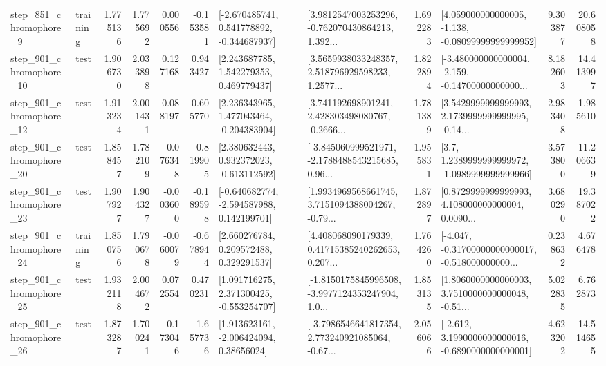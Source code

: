 \begin{tabular}{llrrrrllrlrr}
   step\_851\_chromophore\_9 &  training &      1.775136 &    1.775692 &      0.000556 & -0.153581 &   [-2.670485741, 0.541778892, -0.344687937] &  [3.9812547003253296, -0.762070430864213, 1.392... &       1.692283 &  [4.059000000000005, -1.138, -0.08099999999999952] &            9.303877 &         20.608058 \\
  step\_901\_chromophore\_10 &      test &      1.906730 &    2.033898 &      0.127168 &  0.943427 &     [2.243687785, 1.542279353, 0.469779437] &  [3.5659938033248357, 2.518796929598233, 1.2577... &       1.822894 &  [-3.480000000000004, -2.159, -0.14700000000000... &            8.182603 &         14.413997 \\
  step\_901\_chromophore\_12 &      test &      1.913234 &    2.001431 &      0.088197 &  0.605770 &    [2.236343965, 1.477043464, -0.204383904] &  [3.741192698901241, 2.428303498080767, -0.2666... &       1.781389 &  [3.5429999999999993, 2.1739999999999995, -0.14... &            2.983408 &          1.985610 \\
  step\_901\_chromophore\_20 &      test &      1.858457 &    1.782109 &     -0.076348 & -0.819905 &    [2.380632443, 0.932372023, -0.613112592] &  [-3.845060999521971, -2.1788488543215685, 0.96... &       1.955831 &     [3.7, 1.2389999999999972, -1.0989999999999966] &            3.573800 &         11.206639 \\
  step\_901\_chromophore\_23 &      test &      1.907927 &    1.904327 &     -0.003600 & -0.189598 &   [-0.640682774, -2.594587988, 0.142199701] &  [1.9934969568661745, 3.7151094388004267, -0.79... &       1.872897 &  [0.8729999999999993, 4.108000000000004, 0.0090... &            3.680290 &         19.387022 \\
  step\_901\_chromophore\_24 &  training &      1.850756 &    1.790678 &     -0.060079 & -0.678944 &     [2.660276784, 0.209572488, 0.329291537] &  [4.408068090179339, 0.41715385240262653, 0.207... &       1.764260 &  [-4.047, -0.31700000000000017, -0.518000000000... &            0.238632 &          4.676478 \\
  step\_901\_chromophore\_25 &      test &      1.932118 &    2.004672 &      0.072554 &  0.470231 &    [1.091716275, 2.371300425, -0.553254707] &  [-1.8150175845996508, -3.9977124353247904, 1.0... &       1.853135 &  [1.8060000000000003, 3.7510000000000048, -0.51... &            5.022835 &          6.762873 \\
  step\_901\_chromophore\_26 &      test &      1.873287 &    1.700241 &     -0.173046 & -1.657736 &     [1.913623161, -2.006424094, 0.38656024] &  [-3.7986546641817354, 2.773240921085064, -0.67... &       2.056066 &  [-2.612, 3.1990000000000016, -0.6890000000000001] &            4.623202 &         14.514655 \\

\end{tabular}
